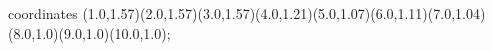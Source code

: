 					coordinates { (1.0,1.57)(2.0,1.57)(3.0,1.57)(4.0,1.21)(5.0,1.07)(6.0,1.11)(7.0,1.04)(8.0,1.0)(9.0,1.0)(10.0,1.0)};